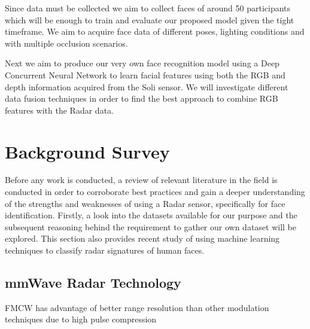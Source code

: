 \documentclass{interim}
\begin{document}
Since data must be collected we aim to collect faces of around 50 participants which will be enough to train and evaluate our proposed model given the tight timeframe. We aim to acquire face data of different poses, lighting conditions and with multiple occlusion scenarios.

Next we aim to produce our very own face recognition model using a Deep Concurrent Neural Network to learn facial features using both the RGB and depth information acquired from the Soli sensor. We will investigate different data fusion techniques in order to find the best approach to combine RGB features with the Radar data.



\section{Background Survey}
Before any work is conducted, a review of relevant literature in the field is conducted in order to corroborate best practices and gain a deeper understanding of the strengths and weaknesses of using a Radar sensor, specifically for face identification. Firstly, a look into the datasets available for our purpose and the subsequent reasoning behind the requirement to gather our own dataset will be explored. This section also provides recent study of using machine learning techniques to classify radar signatures of human faces. 

\subsection{mmWave Radar Technology}
FMCW has advantage of better range resolution than other modulation techniques due to high pulse compression \cite{mahafza2005radar}
\end{document}
